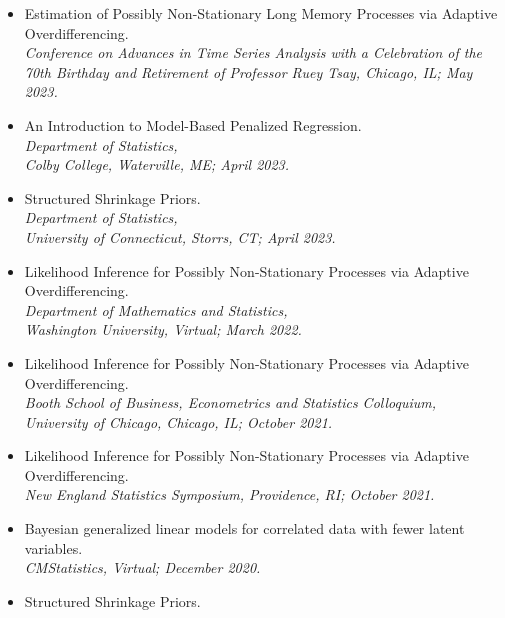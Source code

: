 \documentclass[11pt]{article}
\newcommand{\tab}{\hspace*{2em}}
\begin{document}
\begin{itemize}
	\item[] Estimation of Possibly Non-Stationary Long Memory Processes via Adaptive Overdifferencing. \\
	\tab \emph{Conference on Advances in Time Series Analysis with a Celebration of the} \\
	\tab \emph{70th Birthday and Retirement of Professor Ruey Tsay, Chicago, IL; May 2023.} \vspace{-2mm}
	\item[] An Introduction to Model-Based Penalized Regression. \\
	\tab \emph{Department of Statistics,} \\
	\tab \emph{Colby College, Waterville, ME; April 2023.} \vspace{-2mm}
	\item[] Structured Shrinkage Priors. \\
	\tab \emph{Department of Statistics,} \\
	\tab \emph{University of Connecticut, Storrs, CT; April 2023.} \vspace{-2mm}
	\item[] Likelihood Inference for Possibly Non-Stationary Processes via Adaptive Overdifferencing. \\
	\tab \emph{Department of Mathematics and Statistics,} \\
	\tab \emph{Washington University, Virtual; March 2022.} \vspace{-2mm}
	\item[] Likelihood Inference for Possibly Non-Stationary Processes via Adaptive Overdifferencing. \\
	\tab \emph{Booth School of Business, Econometrics and Statistics Colloquium,} \\
	\tab \emph{University of Chicago, Chicago, IL; October 2021.} \vspace{-2mm}
	\item[] Likelihood Inference for Possibly Non-Stationary Processes via Adaptive Overdifferencing. \\
	\tab \emph{New England Statistics Symposium, Providence, RI; October 2021. }\vspace{-2mm}
	\item[] Bayesian generalized linear models for correlated data with fewer latent variables. \\
	\tab \emph{CMStatistics, Virtual; December 2020. } \vspace{-2mm}
	\item[] Structured Shrinkage Priors. \\

\end{itemize}
\end{document}
